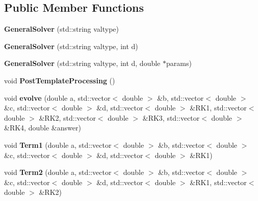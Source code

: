 \subsection*{Public Member Functions}
\begin{DoxyCompactItemize}
\item 
\mbox{\label{classGeneralSolver_ab558a72e287752a64449810029ef036f}} 
{\bfseries General\+Solver} (std\+::string valtype)
\item 
\mbox{\label{classGeneralSolver_a5a8d5e0b856b0fb7fb7a05fd6da84fcb}} 
{\bfseries General\+Solver} (std\+::string valtype, int d)
\item 
\mbox{\label{classGeneralSolver_a79d402c597f2e84337d89036eba4ef9b}} 
{\bfseries General\+Solver} (std\+::string valtype, int d, double $\ast$params)
\item 
\mbox{\label{classGeneralSolver_af26d2bd217b8b2303d5c41d60376588c}} 
void {\bfseries Post\+Template\+Processing} ()
\item 
\mbox{\label{classGeneralSolver_a35bc9d64300be88f4a64d426016018c4}} 
void {\bfseries evolve} (double a, std\+::vector$<$ double $>$ \&b, std\+::vector$<$ double $>$ \&c, std\+::vector$<$ double $>$ \&d, std\+::vector$<$ double $>$ \&R\+K1, std\+::vector$<$ double $>$ \&R\+K2, std\+::vector$<$ double $>$ \&R\+K3, std\+::vector$<$ double $>$ \&R\+K4, double \&answer)
\item 
\mbox{\label{classGeneralSolver_a6d8ecaeb7aa8833616f94e526e9ecf75}} 
void {\bfseries Term1} (double a, std\+::vector$<$ double $>$ \&b, std\+::vector$<$ double $>$ \&c, std\+::vector$<$ double $>$ \&d, std\+::vector$<$ double $>$ \&R\+K1)
\item 
\mbox{\label{classGeneralSolver_aff0944c9a83904ca7f06b49bd4a30e62}} 
void {\bfseries Term2} (double a, std\+::vector$<$ double $>$ \&b, std\+::vector$<$ double $>$ \&c, std\+::vector$<$ double $>$ \&d, std\+::vector$<$ double $>$ \&R\+K1, std\+::vector$<$ double $>$ \&R\+K2)
\item 
\mbox{\label{classGeneralSolver_a36e8b1a601b8eaa6e9fdb9db33d1c82e}} 

\end{DoxyCompactItemize}
